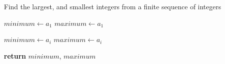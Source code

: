 \documentclass[a4paper, 12pt]{article}
\begin{document}
	
	\begin{algorithm}

		\renewcommand{\thealgorithm}{3.1.20}
		
		\caption{Find the largest, and smallest integers from a finite sequence of integers}
		
		\begin{algorithmic}[1]
			
			
			\State $minimum \gets a_1$
			\State $maximum \gets a_1$
			
					\State $minimum \gets a_i$
				\EndIf
					\State $maximum \gets a_i$
				\EndIf
			\EndFor
			
			\State \textbf{return} $minimum$, $maximum$
			\EndProcedure
			
		\end{algorithmic}

	\end{algorithm}
\end{document}

